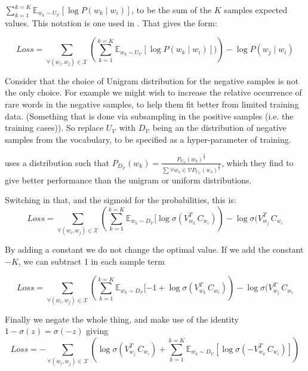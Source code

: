 \documentclass[parskip]{komatufte}
\begin{document}
$\sum_{k=1}^{k=K} \mathbb{E}_{w_k \sim U_{\mathcal{V}}} [\log P(w_k\mid w_i)]$,
to be the sum of the $K$ samples expected values.
This notation is one used in .
That gives the form:

\begin{equation}
Loss = \sum_{\forall (w_i,w_j)\in \mathcal{X}} 
\left(\sum_{k=1}^{k=K} \mathbb{E}_{w_k \sim U_{\mathcal{V}}} [\log P(w_k\mid w_i)]) \right)
-\log P(w_j\mid w_i)
\end{equation}

Consider that the choice of Unigram distribution for the negative samples is not the only choice.
For example we might wish to increase the relative occurrence of rare words in the negative samples, to help them fit better from limited training data.
(Something that is done via subsampling in the positive samples (i.e. the training cases)).
So replace $U_{\mathcal{V}}$ with $D_{\mathcal{V}}$ being an the distribution of negative samples from the vocabulary,
to be specified as a hyper-parameter of training.

 uses a distribution such that $P_{D_\mathcal{V}}(w_k) =  \frac{P_{U_\mathcal{V}}(w_k)^{\frac{2}{3}}}{\sum {\forall }w_o\in \mathcal{V} P_{U_\mathcal{V}}(w_o)^{\frac{2}{3}}}$,
which they find to give better performance than the unigram or uniform distributions.

Switching in that, and the sigmoid for the probabilities, this is:
\begin{equation}
Loss = \sum_{\forall (w_i,w_j)\in \mathcal{X}} 
\left(\sum_{k=1}^{k=K} \mathbb{E}_{w_k \sim D_{\mathcal{V}}} [\log \sigma(V_{w_k}^T\,C_{w_{i}}) \right)
-\log \sigma(V_{w_j}^T\,C_{w_{i}}
\end{equation}

By adding a constant we do not change the optimal value.
If we add the constant $-K$, we can subtract 1 in each sample term

\begin{equation}
Loss = \sum_{\forall (w_i,w_j)\in \mathcal{X}} 
\left(\sum_{k=1}^{k=K} \mathbb{E}_{w_k \sim D_{\mathcal{V}}} [-1 + \log \sigma(V_{w_k}^T\,C_{w_{i}}) \right)
-\log \sigma(V_{w_j}^T\,C_{w_{i}}
\end{equation}

Finally we negate the whole thing, and make use of the identity $1-\sigma(z) = \sigma(-z)$
giving
\begin{equation}
Loss = -\sum_{\forall (w_i,w_j)\in \mathcal{X}}
\left(
\log \sigma(V_{w_j}^T\,C_{w_{i}}) + \sum_{k=1}^{k=K} \mathbb{E}_{w_k \sim D_{\mathcal{V}}} [\log \sigma(-V_{w_k}^T\,C_{w_{i}})] 
\right)
\end{equation}
\end{document}
